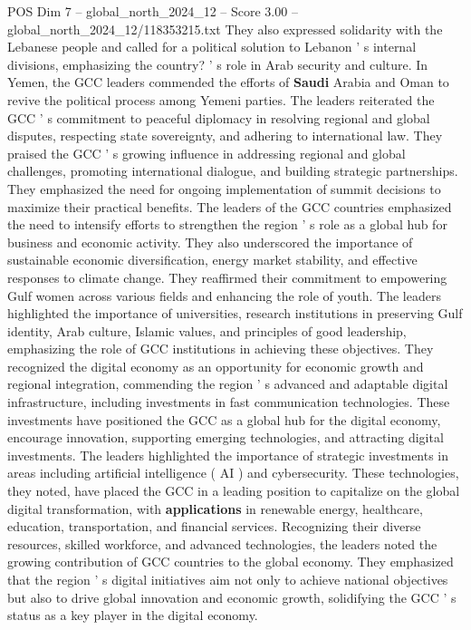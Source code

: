 \begin{textsample}{POS Dim 7 – global\_north\_2024\_12 – Score 3.00 – global\_north\_2024\_12/118353215.txt}
They also expressed solidarity with the Lebanese people and called for a political solution to Lebanon ' s internal divisions, emphasizing the country? ' s role in Arab security and culture.
In Yemen, the GCC leaders commended the efforts of \textbf{Saudi} Arabia and Oman to revive the political process among Yemeni parties.
The leaders reiterated the GCC ' s commitment to peaceful diplomacy in resolving regional and global disputes, respecting state sovereignty, and adhering to international law.
They praised the GCC ' s growing influence in addressing regional and global challenges, promoting international dialogue, and building strategic partnerships.
They emphasized the need for ongoing implementation of summit decisions to maximize their practical benefits.
The leaders of the GCC countries emphasized the need to intensify efforts to strengthen the region ' s role as a global hub for business and economic activity.
They also underscored the importance of sustainable economic diversification, energy market stability, and effective responses to climate change.
They reaffirmed their commitment to empowering Gulf women across various fields and enhancing the role of youth.
The leaders highlighted the importance of universities, research institutions in preserving Gulf identity, Arab culture, Islamic values, and principles of good leadership, emphasizing the role of GCC institutions in achieving these objectives.
They recognized the digital economy as an opportunity for economic growth and regional integration, commending the region ' s advanced and adaptable digital infrastructure, including investments in fast communication technologies.
These investments have positioned the GCC as a global hub for the digital economy, encourage innovation, supporting emerging technologies, and attracting digital investments.
The leaders highlighted the importance of strategic investments in areas including artificial intelligence ( AI ) and cybersecurity.
These technologies, they noted, have placed the GCC in a leading position to capitalize on the global digital transformation, with \textbf{applications} in renewable energy, healthcare, education, transportation, and financial services.
Recognizing their diverse resources, skilled workforce, and advanced technologies, the leaders noted the growing contribution of GCC countries to the global economy.
They emphasized that the region ' s digital initiatives aim not only to achieve national objectives but also to drive global innovation and economic growth, solidifying the GCC ' s status as a key player in the digital economy.

\end{textsample}

